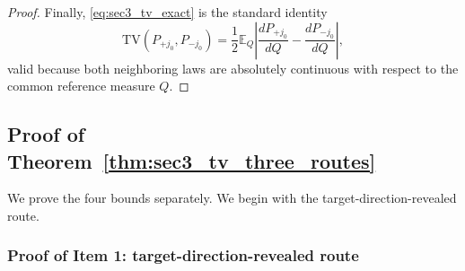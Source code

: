 \documentclass[10pt]{article}
\newcommand{\Ebb}{\mathbb E}
\newcommand{\TV}{\mathrm{TV}}
\begin{document}
\begin{proof}
Finally, \eqref{eq:sec3_tv_exact} is the standard identity
\[
    \TV(P_{+j_0},P_{-j_0})
    =
    \frac12 \Ebb_Q\left|
        \frac{dP_{+j_0}}{dQ}-\frac{dP_{-j_0}}{dQ}
    \right|,
\]
valid because both neighboring laws are absolutely continuous with respect to
the common reference measure $Q$.
\end{proof}

\subsection{Proof of Theorem~\ref{thm:sec3_tv_three_routes}}

We prove the four bounds separately. We begin with the target-direction-revealed
route.

\subsubsection{Proof of Item 1: target-direction-revealed route}
\end{document}
